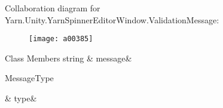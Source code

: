 Collaboration diagram for Yarn.\-Unity.\-Yarn\-Spinner\-Editor\-Window.\-Validation\-Message\-:
\nopagebreak
\begin{figure}[H]
\begin{center}
\leavevmode
\texttt{[image: a00385]}
\end{center}
\end{figure}
\begin{DoxyFields}{Class Members}
\hypertarget{a00186_a636dce6708e779c201fa5e7d01cf2955}{string}\label{a00186_a636dce6708e779c201fa5e7d01cf2955}
&
message&
\\
\hline

\hypertarget{a00186_a7d342190c7657fbbe85eb6fa66bcabb8}{Message\-Type}\label{a00186_a7d342190c7657fbbe85eb6fa66bcabb8}
&
type&
\\
\hline

\end{DoxyFields}
